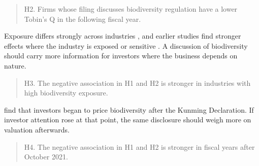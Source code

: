 \documentclass[12pt,a4paper]{article}
\begin{document}
\begin{quote}
H2. Firms whose filing discusses biodiversity regulation have a lower Tobin's Q in the following fiscal year.
\end{quote}

Exposure differs strongly across industries \citep{giglio2026}, and earlier studies find stronger effects where the industry is exposed or sensitive \citep{ahmad2024,bach2025}. A discussion of biodiversity should carry more information for investors where the business depends on nature.

\begin{quote}
H3. The negative association in H1 and H2 is stronger in industries with high biodiversity exposure.
\end{quote}

\citet{garel2024} find that investors began to price biodiversity after the Kunming Declaration. If investor attention rose at that point, the same disclosure should weigh more on valuation afterwards.

\begin{quote}
H4. The negative association in H1 and H2 is stronger in fiscal years after October 2021.
\end{quote}
\end{document}
